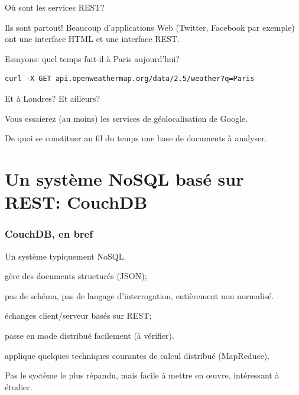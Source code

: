 \begin{frame}[fragile]{Où sont les services REST?}

Ils sont partout! Beaucoup d'applications Web (Twitter, Facebook par
exemple) ont une interface HTML \alert{et} une interface REST.

\vfill

Essayons: quel temps fait-il à Paris aujourd'hui?

\begin{verbatim}
curl -X GET api.openweathermap.org/data/2.5/weather?q=Paris
\end{verbatim}

Et à Londres? Et ailleurs?

\vfill

Vous essaierez (au moins) les services de géolocalisation de Google. 

\vfill

De quoi se constituer au fil du temps une base de documents à analyser.

\end{frame}

\section{Un système NoSQL basé sur REST: CouchDB}

\begin{frame}
\frametitle{CouchDB, en bref}

Un système typiquement NoSQL.

\begin{redbullet}
  \item gère des documents structurés (JSON);
 
  \item pas de schéma, pas de langage d'interrogation, entièrement \alert{non} normalisé.
  
  \item échanges client/serveur basés sur REST;

  \item passe en mode distribué facilement (à vérifier).
  
  \item applique quelques techniques courantes de calcul distribué (MapReduce).
\end{redbullet}

\vfill

Pas le système le plus répandu, mais facile à mettre en œuvre, intéressant à étudier.

\end{frame}


